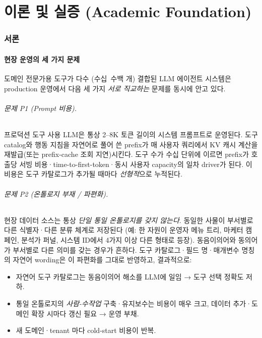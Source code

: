 \documentclass[11pt]{article}
\theoremstyle{definition}
\begin{document}
\tableofcontents
\newpage

\part{이론 및 실증 (Academic Foundation)}

\section{서론}
\label{sec:intro}

\subsection{현장 운영의 세 가지 문제}
\label{sec:three-problems}

도메인 전문가용 도구가 다수 (수십~수백 개) 결합된 LLM 에이전트 시스템은 production 운영에서 다음 세 가지 \emph{서로 직교하는} 문제를 동시에 안고 있다.

\paragraph{문제 P1 (Prompt 비용).}
프로덕션 도구 사용 LLM은 통상 2--8K 토큰 길이의 시스템 프롬프트로 운영된다. 도구 catalog와 행동 지침을 자연어로 풀어 쓴 prefix가 매 사용자 쿼리에서 KV 캐시 계산을 재발급(또는 prefix-cache 조회 지연)시킨다. 도구 수가 수십 단위에 이르면 prefix가 호출당 서빙 비용·time-to-first-token·동시 사용자 capacity의 일차 driver가 된다. 이 비용은 도구 카탈로그가 추가될 때마다 \emph{선형적}으로 누적된다.

\paragraph{문제 P2 (온톨로지 부재 / 파편화).}
현장 데이터 소스는 통상 \emph{단일 통일 온톨로지를 갖지 않는다}. 동일한 사물이 부서별로 다른 식별자·다른 분류 체계로 저장된다 (예: 한 자원이 운영자 메뉴 트리, 마케터 캠페인, 분석가 퍼널, 시스템 ID에서 4가지 이상 다른 형태로 등장). 동음이의어와 동의어가 부서별로 다른 의미를 갖는 경우가 흔하다. 도구 카탈로그·필드 명·매개변수 명칭의 자연어 wording은 이 파편화를 그대로 반영하고, 결과적으로:
\begin{itemize}[leftmargin=*]
\item 자연어 도구 카탈로그는 동음이의어 해소를 LLM에 일임 → 도구 선택 정확도 저하.
\item 통일 온톨로지의 \emph{사람-수작업} 구축·유지보수는 비용이 매우 크고, 데이터 추가·도메인 확장 시마다 갱신 필요 → 운영 부채.
\item 새 도메인·tenant 마다 cold-start 비용이 반복.
\end{itemize}
\end{document}
